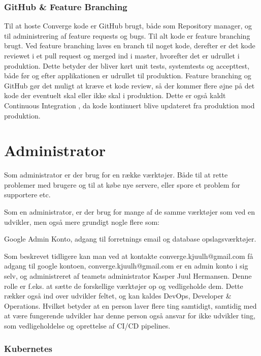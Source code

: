 \cite{documentation_terms}

\subsubsection{GitHub \& Feature Branching}

Til at hoste Converge kode er GitHub brugt, både som Repository manager, og til administrering af feature requests og bugs. Til alt kode er feature branching brugt. Ved feature branching laves en branch til noget kode, derefter er det kode reviewet i et pull request og merged ind i master, hvorefter det er udrullet i produktion. Dette betyder der bliver kørt unit tests, systemtests og accepttest, både før og efter applikationen er udrullet til produktion. Feature branching og GitHub gør det muligt at kræve et kode review, så der kommer flere øjne på det kode der eventuelt skal eller ikke skal i produktion. Dette er også kaldt Continuous Integration , da kode kontinuert blive updateret fra produktion mod produktion.

\section{Administrator}

Som administrator er der brug for en række værktøjer. Både til at rette problemer med brugere og til at købe nye servere, eller spore et problem for supportere etc.

Som en administrator, er der brug for mange af de samme værktøjer som ved en udvikler, men også mere grundigt nogle flere som:

Google Admin Konto, adgang til forretnings email og database opslagsværktøjer.

Som beskrevet tidligere kan man ved at kontakte converge.kjuulh@gmail.com få adgang til google kontoen, converge.kjuulh@gmail.com er en admin konto i sig selv, og administreret af teamets administrator Kasper Juul Hermansen. Denne rolle er f.eks. at sætte de forskellige værktøjer op og vedligeholde dem. Dette rækker også ind over udvikler feltet, og kan kaldes DevOps, Developer \& Operations. Hvilket betyder at en person laver flere ting samtidigt, samtidig med at være fungerende udvikler har denne person også ansvar for ikke udvikler ting, som vedligeholdelse og oprettelse af CI/CD pipelines.

\subsubsection{Kubernetes}

